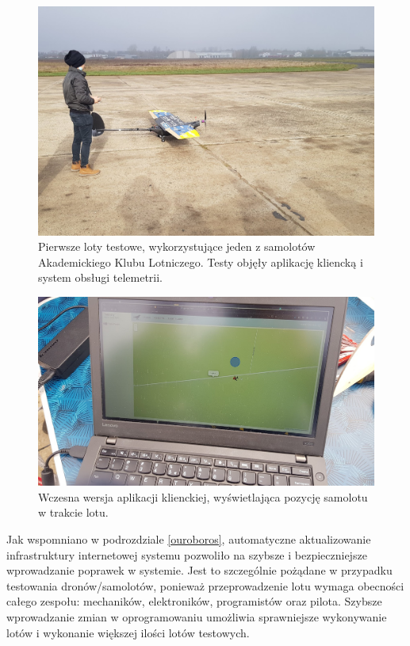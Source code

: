 \begin{figure}[H]
	\centering
	\includegraphics[width=0.8\linewidth]{rys05/test_sae.jpg}
    \caption{
        Pierwsze loty testowe, wykorzystujące jeden z samolotów Akademickiego
        Klubu Lotniczego. Testy objęły aplikację kliencką i system obsługi telemetrii.
    }
	\label{test_sae}
\end{figure}

\begin{figure}[H]
	\centering
	\includegraphics[width=0.8\linewidth]{rys05/sae_telem.jpg}
    \caption{
        Wczesna wersja aplikacji klienckiej, wyświetlająca pozycję samolotu w trakcie lotu.
    }
	\label{telem_sae}
\end{figure}

Jak wspomniano w podrozdziale \ref{ouroboros}, automatyczne aktualizowanie infrastruktury
internetowej systemu pozwoliło na szybsze i bezpieczniejsze wprowadzanie poprawek w systemie.
Jest to szczególnie pożądane w przypadku testowania dronów/samolotów, ponieważ przeprowadzenie
lotu wymaga obecności całego zespołu: mechaników, elektroników, programistów oraz pilota. Szybsze
wprowadzanie zmian w oprogramowaniu umożliwia sprawniejsze wykonywanie lotów i wykonanie
większej ilości lotów testowych.

